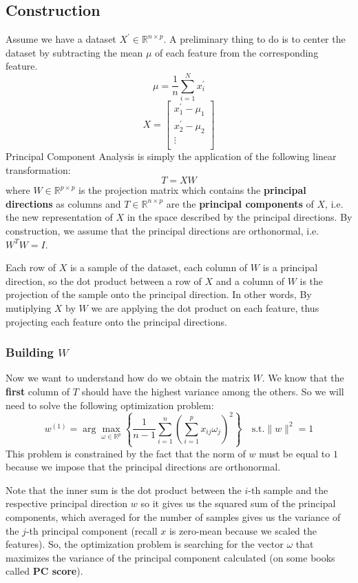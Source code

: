 \subsection{Construction}
Assume we have a dataset $X^{\prime} \in \mathbb{R}^{n \times p}$. A preliminary thing to do is to center the dataset by subtracting the mean $\mu$ of each feature from the corresponding feature.
\[
    \mu = \frac{1}{n} \sum_{i = 1}^{N} x^{\prime}_i
\]
\[
    X = \begin{bmatrix}
        x^{\prime}_1 - \mu_1 \\
        x^{\prime}_2 - \mu_2 \\
        \vdots               \\
    \end{bmatrix}
\]
Principal Component Analysis is simply the application of the following linear transformation:
\[
    T = X W
\]
where $W \in \mathbb{R}^{p \times p}$ is the projection matrix which contains the \textbf{principal directions} as columns and $T \in \mathbb{R}^{n \times p}$ are the \textbf{principal components} of $X$, i.e. the new representation of $X$ in the space described by the principal directions. By construction, we assume that the principal directions are orthonormal, i.e. $W^T W = I$.

Each row of $X$ is a sample of the dataset, each column of $W$ is a principal direction, so the dot product between a row of $X$ and a column of $W$ is the projection of the sample onto the principal direction. In other words, By mutiplying $X$ by $W$ we are applying the dot product on each feature, thus projecting each feature onto the principal directions.

\subsubsection*{Building $W$}
Now we want to understand how do we obtain the matrix $W$. We know that the \textbf{first} column of $T$ should have the highest variance among the others. So we will need to solve the following optimization problem:
\[
    w^{(1)} = \arg \max_{\omega \in \mathbb{R}^p} \left\{\frac{1}{n-1} \sum_{i = 1}^{n} \left(\sum_{i = 1}^{p} x_{ij} \omega_j \right)^2\right\} \quad \text{s.t.} \|w\|^2 = 1
\]
This problem is constrained by the fact that the norm of $w$ must be equal to $1$ because we impose that the principal directions are orthonormal.

Note that the inner sum is the dot product between the $i$-th sample and the respective principal direction $w$ so it gives us the squared sum of the principal components, which averaged for the number of samples gives us the variance of the $j$-th principal component (recall $x$ is zero-mean because we scaled the features).
So, the optimization problem is searching for the vector $\omega$ that maximizes the variance of the principal component calculated (on some books called \textbf{PC score}).

